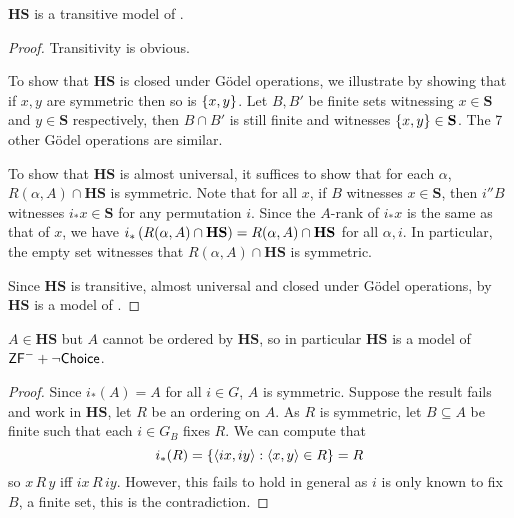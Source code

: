 \begin{theorem} \label{theorem:f-k-model-zfminus}
    \(\mathbf{HS}\) is a transitive model of \ZFminus.
\end{theorem}
\begin{proof}
    Transitivity is obvious.

    To show that \(\mathbf{HS}\) is closed under Gödel operations,
    we illustrate by showing that if \(x,y\) are symmetric then so is \({\left\{ x,y \right\}}\).
    Let \(B, B'\) be finite sets witnessing \(x\in \mathbf{S}\) and \(y\in\mathbf{S}\) respectively,
    then \(B\cap B'\) is still finite and witnesses \({\left\{ x,y \right\}} \in \mathbf{S}\).
    The 7 other Gödel operations are similar.

    To show that \(\mathbf{HS}\) is almost universal,
    it suffices to show that for each \(\alpha\),
    \(R(\alpha,A) \cap \mathbf{HS}\) is symmetric.
    Note that for all \(x\), if \(B\) witnesses \(x\in \mathbf{S}\),
    then \(i''B\) witnesses \(i_* x\in \mathbf{S}\) for any permutation \(i\).
    Since the \(A\)-rank of \(i_* x\) is the same as that of \(x\),
    we have \(i_*\left(R(\alpha,A) \cap \mathbf{HS}\right) = R(\alpha,A) \cap \mathbf{HS}\) for all \(\alpha, i\).
    In particular, the empty set witnesses that \(R(\alpha,A)\cap\mathbf{HS}\) is symmetric.

    Since \(\mathbf{HS}\) is transitive, almost universal and closed under Gödel operations, by  \(\mathbf{HS}\) is a model of \ZFminus.
\end{proof}

\begin{theorem}
    \(A\in\mathbf{HS}\) but \(A\) cannot be ordered by \(\mathbf{HS}\), so in particular
    \(\mathbf{HS}\) is a model of \(\mbox{\normalfont \textsf{ZF}}^- + \lnot{\normalfont\textsf{Choice}}\).
\end{theorem}
\begin{proof}
    Since \(i_*(A) = A\) for all \(i\in G\), \(A\) is symmetric.
    Suppose the result fails and work in \(\mathbf{HS}\), let \(R\) be an ordering on \(A\).
    As \(R\) is symmetric, let \(B\subseteq A\) be finite such that each \(i\in G_B\) fixes \(R\).
    We can compute that
    \[ i_*(R) = {\left\{ \left\langle i x,i y\right\rangle: \left\langle x,y\right\rangle\in R \right\}} = R \]
    so \(x\,R\,y\) iff \(i x\,R\,i y\).
    However, this fails to hold in general as \(i\) is only known to fix \(B\), a finite set, this is the contradiction.
\end{proof}

